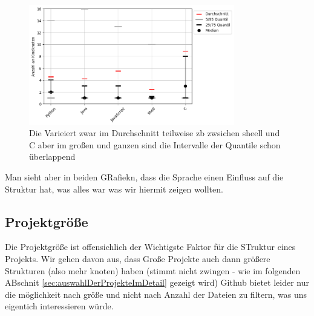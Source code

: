     \begin{figure}
        \centering
        \includegraphics[width=0.8\textwidth]{images/datenanalyse/spracheVsBreite.png}
        \caption{Die Varieiert zwar im Durchschnitt teilweise zb zwsichen sheell und C aber im großen und ganzen sind die Intervalle der Quantile schon überlappend}
        \label{fig:spracheVsBreite}
    \end{figure}

    
Man sieht aber in beiden GRafiekn, dass die Sprache einen Einfluss auf die Struktur hat, was alles war was wir hiermit zeigen wollten.

\subsection*{Projektgröße} Die Projektgröße ist offensichlich der Wichtigste Faktor für die STruktur eines Projekts. Wir gehen davon aus, dass Große Projekte auch dann größere Strukturen (also mehr knoten) haben (stimmt nicht zwingen - wie im folgenden ABschnit \ref{sec:auswahlDerProjekteImDetail} gezeigt wird) Github bietet leider nur die möglichkeit nach größe und nicht nach Anzahl der Dateien zu filtern, was uns eigentich interessieren würde. 

